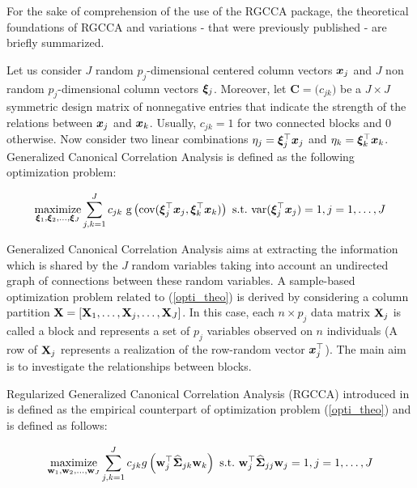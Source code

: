 \documentclass[
]{jss}
\begin{document}
For the sake of comprehension of the use of the RGCCA package, the
theoretical foundations of RGCCA and variations - that were previously
published \citetext{\citealp[ ]{Tenenhaus2011}; \citealp[
]{Tenenhaus2014}; \citealp[ ]{Tenenhaus2015}; \citealp{Tenenhaus2017}} -
are briefly summarized.

Let us consider \(J\) random \(p_j\)-dimensional centered column vectors
\(\boldsymbol{x}_j\) and \(J\) non random \(p_j\)-dimensional column vectors
\(\boldsymbol{\xi}_j\). Moreover, let \(\mathbf{C}=\big(c_{jk}\big)\) be a
\(J \times J\) symmetric design matrix of nonnegative entries that
indicate the strength of the relations between \(\boldsymbol{x}_j\) and
\(\boldsymbol{x}_k\). Usually, \(c_{jk} = 1\) for two connected blocks and \(0\)
otherwise. Now consider two linear combinations
\(\eta_j = \boldsymbol{\xi}_j^\top\boldsymbol{x}_j\) and \(\eta_k = \boldsymbol{\xi}_k^\top\boldsymbol{x}_k\).
Generalized Canonical Correlation Analysis is defined as the following
optimization problem:

\begin{equation} 
\underset{\boldsymbol{\xi}_1,\boldsymbol{\xi}_2,
\ldots,\boldsymbol{\xi}_J}{\text{maximize}}  \displaystyle  \sum_{j, k = 1}^J c_{jk} \text{
g}\left( \text{cov}(\boldsymbol{\xi}_j^\top\boldsymbol{x}_j, \boldsymbol{\xi}_k^\top\boldsymbol{x}_k)\right)\\
\mathrm{~s.t.~} \text{var}(\boldsymbol{\xi}_j^\top\boldsymbol{x}_j)=1, j =1, \ldots, J
\label{opti_theo}
\end{equation}

Generalized Canonical Correlation Analysis aims at extracting the
information which is shared by the \(J\) random variables taking into
account an undirected graph of connections between these random
variables. A sample-based optimization problem related to
(\ref{opti_theo}) is derived by considering a column partition
\(\mathbf{X} = [\mathbf{X}_1, \ldots, \mathbf{X}_j, \ldots, \mathbf{X}_J]\). In this case, each
\(n \times p_j\) data matrix \(\mathbf{X}_j\) is called a block and represents a
set of \(p_j\) variables observed on \(n\) individuals (A row of
\(\mathbf{X}_j\) represents a realization of the row-random vector
\(\boldsymbol{x}_j^\top\)). The main aim is to investigate the relationships
between blocks.

Regularized Generalized Canonical Correlation Analysis (RGCCA)
introduced in \citep{Tenenhaus2011} is defined as the empirical
counterpart of optimization problem (\ref{opti_theo}) and is defined as
follows:

\begin{equation}
\underset{\mathbf{w}_1, \mathbf{w}_2, \ldots,\mathbf{w}_J}{\text{maximize}}
\sum_{j, k = 1}^J c_{jk} g\left(\mathbf{w}_j^\top
\widehat{\mathbf{\Sigma}}_{jk}\mathbf{w}_k \right)\\ \mathrm{~s.t.~}\mathbf{w}_j^\top\widehat{\mathbf{\Sigma}}_{jj}\mathbf{w}_j=1, j =1, \ldots, J
\label{opti_emp1}
\end{equation}
\end{document}
